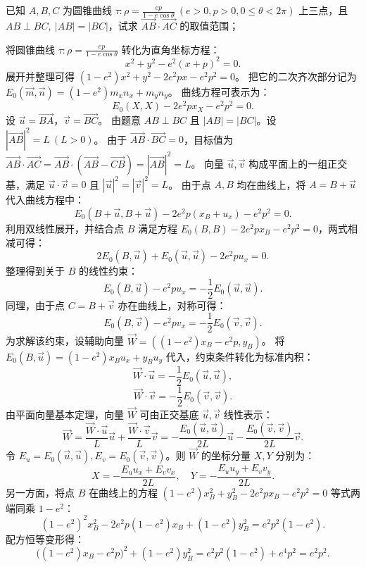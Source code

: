 \begin{example}
已知 $A,B,C$ 为圆锥曲线 $\tau: \rho = \frac{ep}{1-e\cos\theta}\ (e>0,p>0,0\leq\theta<2\pi)$ 上三点，且 $AB \perp BC,\ |AB|=|BC|$，试求 $\overrightarrow{AB} \cdot \overrightarrow{AC}$ 的取值范围；
\end{example}
\begin{solution}
将圆锥曲线 $\tau: \rho = \frac{ep}{1-e\cos\theta}$ 转化为直角坐标方程：
\[ x^2 + y^2 - e^2(x+p)^2 = 0. \]
展开并整理可得 $(1-e^2)x^2 + y^2 - 2e^2px - e^2p^2 = 0$。
把它的二次齐次部分记为 $E_0(\vec{m}, \vec{n}) = (1-e^2)m_x n_x + m_y n_y$。
曲线方程可表示为：
\[ E_0(X, X) - 2e^2px_X - e^2p^2 = 0. \]
设 $\vec{u} = \overrightarrow{BA}$，$\vec{v} = \overrightarrow{BC}$。
由题意 $AB \perp BC$ 且 $|AB| = |BC|$。设 $|\overrightarrow{AB}|^2 = L\ (L>0)$。
由于 $\overrightarrow{AB} \cdot \overrightarrow{BC} = 0$，目标值为 $\overrightarrow{AB} \cdot \overrightarrow{AC} = \overrightarrow{AB} \cdot (\overrightarrow{AB} - \overrightarrow{CB}) = |\overrightarrow{AB}|^2 = L$。
向量 $\vec{u}, \vec{v}$ 构成平面上的一组正交基，满足 $\vec{u} \cdot \vec{v} = 0$ 且 $|\vec{u}|^2 = |\vec{v}|^2 = L$。
由于点 $A, B$ 均在曲线上，将 $A = B + \vec{u}$ 代入曲线方程中：
\[ E_0(B + \vec{u}, B + \vec{u}) - 2e^2p(x_B + u_x) - e^2p^2 = 0. \]
利用双线性展开，并结合点 $B$ 满足方程 $E_0(B, B) - 2e^2px_B - e^2p^2 = 0$，两式相减可得：
\[ 2E_0(B, \vec{u}) + E_0(\vec{u}, \vec{u}) - 2e^2pu_x = 0. \]
整理得到关于 $B$ 的线性约束：
\[ E_0(B, \vec{u}) - e^2pu_x = -\frac{1}{2} E_0(\vec{u}, \vec{u}). \]
同理，由于点 $C = B + \vec{v}$ 亦在曲线上，对称可得：
\[ E_0(B, \vec{v}) - e^2pv_x = -\frac{1}{2} E_0(\vec{v}, \vec{v}). \]
为求解该约束，设辅助向量 $\vec{W} = ((1-e^2)x_B - e^2p, y_B)$。
将 $E_0(B, \vec{u}) = (1-e^2)x_B u_x + y_B u_y$ 代入，约束条件转化为标准内积：
\[ \vec{W} \cdot \vec{u} = -\frac{1}{2} E_0(\vec{u}, \vec{u}), \]
\[ \vec{W} \cdot \vec{v} = -\frac{1}{2} E_0(\vec{v}, \vec{v}). \]
由平面向量基本定理，向量 $\vec{W}$ 可由正交基底 $\vec{u}, \vec{v}$ 线性表示：
\[ \vec{W} = \frac{\vec{W} \cdot \vec{u}}{L} \vec{u} + \frac{\vec{W} \cdot \vec{v}}{L} \vec{v} = -\frac{E_0(\vec{u}, \vec{u})}{2L} \vec{u} - \frac{E_0(\vec{v}, \vec{v})}{2L} \vec{v}. \]
令 $E_u = E_0(\vec{u}, \vec{u}), E_v = E_0(\vec{v}, \vec{v})$。则 $\vec{W}$ 的坐标分量 $X, Y$ 分别为：
\[ X = -\frac{E_u u_x + E_v v_x}{2L}, \quad Y = -\frac{E_u u_y + E_v v_y}{2L}. \]
另一方面，将点 $B$ 在曲线上的方程 $(1-e^2)x_B^2 + y_B^2 - 2e^2px_B - e^2p^2 = 0$ 等式两端同乘 $1-e^2$：
\[ (1-e^2)^2 x_B^2 - 2e^2p(1-e^2)x_B + (1-e^2)y_B^2 = e^2p^2(1-e^2). \]
配方恒等变形得：
\[ \big((1-e^2)x_B - e^2p\big)^2 + (1-e^2)y_B^2 = e^2p^2(1-e^2) + e^4p^2 = e^2p^2. \]

\end{solution}
